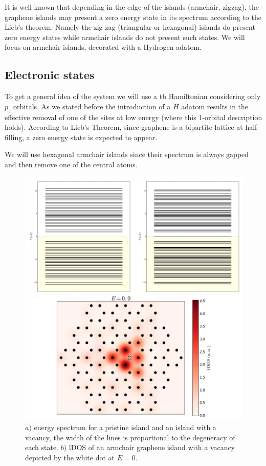 It is well known that depending in the edge of the islands (armchair, zigzag), the graphene islands may present a zero energy state in its spectrum according to the Lieb's theorem. Namely the zig-zag (triangular or hexagonal) islands do present zero energy states while armchair islands do not present such states.
We will focus on armchair islands, decorated with a Hydrogen adatom.


\subsection{Electronic states}
To get a general idea of the system we will use a \ac{tb} Hamiltonian considering only $p_z$ orbitals. As we stated before the introduction of a $H$ adatom results in the effective removal of one of the sites at low energy (where this 1-orbital description holds). According to Lieb's Theorem, since graphene is a bipartite lattice at half filling, a zero energy state is expected to appear.

We will use hexagonal armchair islands since their spectrum is always gapped and then remove one of the central atoms.

\begin{figure}[h!]
\centering
\includegraphics{chapter05/figures/espectro.png}
\vspace{-5pt}
\caption{$a)$ energy spectrum for a pristine island and an island with a vacancy, the width of the lines is proportional to the degeneracy of each state. $b)$ \ac{lDOS} of an armchair graphene island with a vacancy depicted by the white dot at $E=0$.}
\label{spectrum1}
\end{figure}
\FloatBarrier

